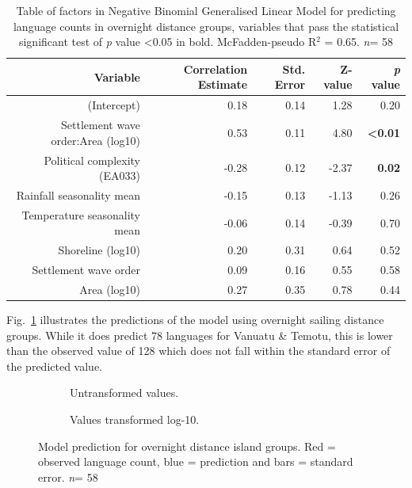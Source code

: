 \documentclass[a4paper,10pt]{article} %
\begin{document}
\begin{table}%
\centering
\begin{tabular}{rrrrr}
  \hline
Variable & Correlation Estimate & Std. Error & Z-value & \emph{p} value \\ 
  \hline
(Intercept) & 0.18 & 0.14 & 1.28 & 0.20 \\ 
Settlement wave order:Area (log10) & 0.53 & 0.11 & 4.80 &   \textbf{<0.01} \\   
Political complexity (EA033) & -0.28 & 0.12 & -2.37 & \textbf{0.02} \\ 
Rainfall seasonality mean & -0.15 & 0.13 & -1.13 & 0.26 \\ 
Temperature seasonality mean & -0.06 & 0.14 & -0.39 & 0.70 \\ 
Shoreline (log10) & 0.20 & 0.31 & 0.64 & 0.52 \\ 
Settlement wave order & 0.09 & 0.16 & 0.55 & 0.58 \\ 
Area (log10)& 0.27 & 0.35 & 0.78 & 0.44 \\ 
 \hline
\end{tabular}
\caption[Table of factors in Negative Binomial Generalised Linear Model for predicting language counts in overnight distance groups.]{Table of factors in Negative Binomial Generalised Linear Model for predicting language counts in overnight distance groups, variables that pass the statistical significant test of \emph{p} value <0.05 in bold. McFadden-pseudo R$^2$ = 0.65.  \emph{n}= 58} 
\label{table:GLM_model_marck}
\end{table}

Fig.~\ref{Marck_model_predict} illustrates the predictions of the model using overnight sailing distance groups. While it does predict 78 languages for Vanuatu \& Temotu, this is lower than the observed value of 128 which does not fall within the standard error of the predicted value.

    \begin{figure}
\centering
    \begin{subfigure}{12cm}
\centering
\caption{Untransformed values.}
    \end{subfigure}
\hfil
    \begin{subfigure}{12cm}
\centering
\caption{Values transformed log-10.}
    \end{subfigure}
\caption[Model prediction for overnight distance island groups.]{{Model prediction for overnight distance island groups. Red = observed language count, blue = prediction and bars = standard error. \emph{n}= 58}}
\label{Marck_model_predict}
\end{figure}
\end{document}
